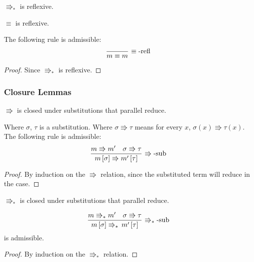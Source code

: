 \begin{fact} $\Rrightarrow_{\ast}$ is reflexive.
\end{fact} 
 
\begin{lem}$\equiv$ is reflexive.

The following rule is admissible:
\[
\frac{\,}{m\equiv m}\,\operatorname{\equiv-refl}
\]
\end{lem}
\begin{proof}
Since $\Rrightarrow_{\ast}$ is reflexive.
\end{proof}
 
\subsubsection{Closure Lemmas}
 
 
 
\begin{lem} $\Rrightarrow$ is closed under substitutions that parallel reduce.
 
Where $\sigma$, $\tau$ is a substitution.
Where $\sigma\Rrightarrow\tau$ means for every $x$, $\sigma\left(x\right)\Rrightarrow\tau\left(x\right)$.
The following rule is admissible:
\[
\frac{m\Rrightarrow m'\quad\sigma\Rrightarrow\tau}{m\left[\sigma\right]\Rrightarrow m'\left[\tau\right]}\,\operatorname{\Rrightarrow-sub}
\]
\end{lem}
\begin{proof}
By induction on the $\Rrightarrow$ relation, since the substituted term will reduce in the  case.
\end{proof}
 
\begin{lem} $\Rrightarrow_{\ast}$ is closed under substitutions that parallel reduce.

\[
\frac{m\Rrightarrow_{\ast}m'\quad\sigma\Rrightarrow\tau}{m\left[\sigma\right]\Rrightarrow_{\ast}\,m'\left[\tau\right]}\,\operatorname{\Rrightarrow_{\ast}-sub}
\]
is admissible.
\end{lem}
\begin{proof}
By induction on the $\Rrightarrow_{\ast}$ relation.
\end{proof}

